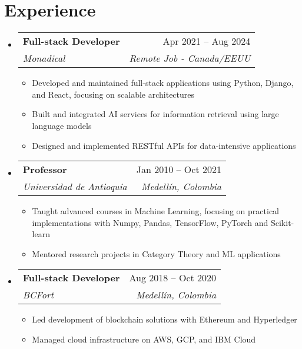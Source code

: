 \documentclass[letterpaper,11pt]{article}
\makeatletter
\newcommand{\resumeSubheading}[4]{
  \vspace{-2pt}
  \item[]
  \begin{tabular*}{\textwidth}{@{\extracolsep{\fill}}l r}
    \textbf{#1} & #2 \\
    \textit{#3} & \textit{#4} \\
  \end{tabular*}
  \vspace{-5pt}
}
\makeatother
\begin{document}
\section{Experience}
\begin{itemize}[leftmargin=0pt, itemindent=0pt, label={}]
\resumeSubheading
{Full-stack Developer}{Apr 2021 -- Aug 2024}
{Monadical}{Remote Job - Canada/EEUU}
\begin{itemize}[leftmargin=*]
    \item Developed and maintained full-stack applications using Python, Django, and React, focusing on scalable architectures
    \item Built and integrated AI services for information retrieval using large language models
    \item Designed and implemented RESTful APIs for data-intensive applications
\end{itemize}

\resumeSubheading
{Professor}{Jan 2010 -- Oct 2021}
{Universidad de Antioquia}{Medellín, Colombia}
\begin{itemize}[leftmargin=*]
    \item Taught advanced courses in Machine Learning, focusing on practical implementations with Numpy, Pandas, TensorFlow, PyTorch and Scikit-learn
    \item Mentored research projects in Category Theory and ML applications
\end{itemize}

\resumeSubheading
{Full-stack Developer}{Aug 2018 -- Oct 2020}
{BCFort}{Medellín, Colombia}
\begin{itemize}[leftmargin=*]
    \item Led development of blockchain solutions with Ethereum and Hyperledger
    \item Managed cloud infrastructure on AWS, GCP, and IBM Cloud
\end{itemize}
\end{itemize}
\newpage
\end{document}
